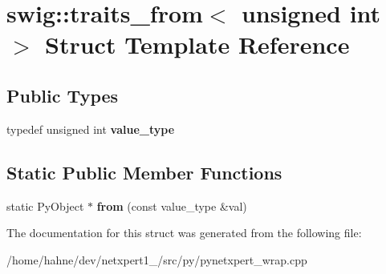 \hypertarget{structswig_1_1traits__from_3_01unsigned_01int_01_4}{}\section{swig\+:\+:traits\+\_\+from$<$ unsigned int $>$ Struct Template Reference}
\label{structswig_1_1traits__from_3_01unsigned_01int_01_4}
\subsection*{Public Types}
\begin{DoxyCompactItemize}
\item 
typedef unsigned int {\bfseries value\+\_\+type}\hypertarget{structswig_1_1traits__from_3_01unsigned_01int_01_4_a926689dba8f153bbe2face0065a88f71}{}\label{structswig_1_1traits__from_3_01unsigned_01int_01_4_a926689dba8f153bbe2face0065a88f71}

\end{DoxyCompactItemize}
\subsection*{Static Public Member Functions}
\begin{DoxyCompactItemize}
\item 
static Py\+Object $\ast$ {\bfseries from} (const value\+\_\+type \&val)\hypertarget{structswig_1_1traits__from_3_01unsigned_01int_01_4_a023fe4a0b88aa54e07c2611e52748846}{}\label{structswig_1_1traits__from_3_01unsigned_01int_01_4_a023fe4a0b88aa54e07c2611e52748846}

\end{DoxyCompactItemize}


The documentation for this struct was generated from the following file\+:\begin{DoxyCompactItemize}
\item 
/home/hahne/dev/netxpert1\+\_/src/py/pynetxpert\+\_\+wrap.\+cpp\end{DoxyCompactItemize}
